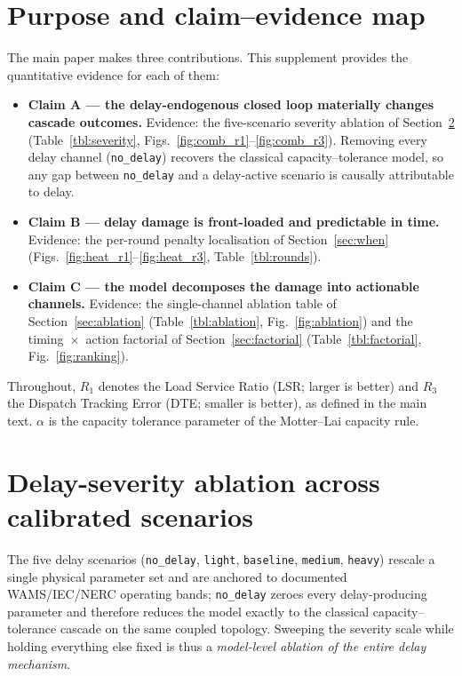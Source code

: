 \documentclass[a4paper,fleqn]{cas-dc}
\newcommand{\Rone}{R_1}
\newcommand{\Rthree}{R_3}
\newcommand{\nodelay}{\texttt{no\_delay}}
\begin{document}
\section{Purpose and claim--evidence map}\label{sec:map}

The main paper makes three contributions.  This supplement provides the
quantitative evidence for each of them:

\begin{itemize}
\item \textbf{Claim A — the delay-endogenous closed loop materially changes
cascade outcomes.}  Evidence: the five-scenario severity ablation of
Section~\ref{sec:severity} (Table~\ref{tbl:severity},
Figs.~\ref{fig:comb_r1}--\ref{fig:comb_r3}).  Removing every delay channel
(\nodelay{}) recovers the classical capacity--tolerance model, so any gap
between \nodelay{} and a delay-active scenario is causally attributable to
delay.
\item \textbf{Claim B — delay damage is front-loaded and predictable in
time.}  Evidence: the per-round penalty localisation of
Section~\ref{sec:when} (Figs.~\ref{fig:heat_r1}--\ref{fig:heat_r3},
Table~\ref{tbl:rounds}).
\item \textbf{Claim C — the model decomposes the damage into actionable
channels.}  Evidence: the single-channel ablation table of
Section~\ref{sec:ablation} (Table~\ref{tbl:ablation},
Fig.~\ref{fig:ablation}) and the timing~$\times$~action factorial of
Section~\ref{sec:factorial} (Table~\ref{tbl:factorial},
Fig.~\ref{fig:ranking}).
\end{itemize}

Throughout, $\Rone$ denotes the Load Service Ratio (LSR; larger is better)
and $\Rthree$ the Dispatch Tracking Error (DTE; smaller is better), as
defined in the main text.  $\alpha$ is the capacity tolerance parameter of
the Motter--Lai capacity rule.

\section{Delay-severity ablation across calibrated scenarios}
\label{sec:severity}

The five delay scenarios (\nodelay{}, \texttt{light}, \texttt{baseline},
\texttt{medium}, \texttt{heavy}) rescale a single physical parameter set and
are anchored to documented WAMS/IEC/NERC operating bands; \nodelay{} zeroes
every delay-producing parameter and therefore reduces the model exactly to
the classical capacity--tolerance cascade on the same coupled topology.
Sweeping the severity scale while holding everything else fixed is thus a
\emph{model-level ablation of the entire delay mechanism}.
\end{document}
